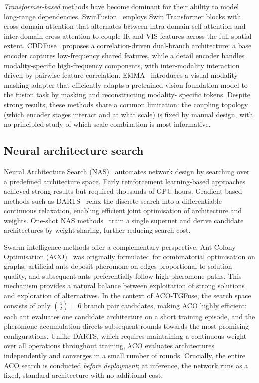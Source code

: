 \documentclass[a4paper,fleqn]{cas-dc}
\begin{document}
\emph{Transformer-based} methods have become dominant for their ability to
model long-range dependencies.  SwinFusion~\cite{swinfusion2022} employs
Swin Transformer blocks with cross-domain attention that alternates between
intra-domain self-attention and inter-domain cross-attention to couple
IR and VIS features across the full spatial extent.  CDDFuse~\cite{cddfuse2023}
proposes a correlation-driven dual-branch architecture: a base encoder captures
low-frequency shared features, while a detail encoder handles
modality-specific high-frequency components, with inter-modality interaction
driven by pairwise feature correlation.  EMMA~\cite{emma2024} introduces a
visual modality masking adapter that efficiently adapts a pretrained vision
foundation model to the fusion task by masking and reconstructing modality-
specific tokens.  Despite strong results, these methods share a common
limitation: the coupling topology (which encoder stages interact and at what
scale) is fixed by manual design, with no principled study of which scale
combination is most informative.

\subsection{Neural architecture search}
\label{sec:rw:nas}

Neural Architecture Search (NAS)~\cite{nas2019} automates network design by
searching over a predefined architecture space.  Early reinforcement
learning-based approaches~\cite{nas2019} achieved strong results but required
thousands of GPU-hours.  Gradient-based methods such as
DARTS~\cite{oneshotnas2020} relax the discrete search into a differentiable
continuous relaxation, enabling efficient joint optimisation of architecture
and weights.  One-shot NAS methods~\cite{oneshotnas2020} train a single
supernet and derive candidate architectures by weight sharing, further
reducing search cost.

Swarm-intelligence methods offer a complementary perspective.  Ant Colony
Optimisation (ACO)~\cite{aco1992} was originally formulated for combinatorial
optimisation on graphs: artificial ants deposit pheromone on edges
proportional to solution quality, and subsequent ants preferentially follow
high-pheromone paths.  This mechanism provides a natural balance between
exploitation of strong solutions and exploration of alternatives.  In the
context of ACO-TGFuse, the search space consists of only $\binom{4}{2}=6$
branch pair candidates, making ACO highly efficient: each ant evaluates one
candidate architecture on a short training episode, and the pheromone
accumulation directs subsequent rounds towards the most promising
configurations.  Unlike DARTS, which requires maintaining a continuous weight
over all operations throughout training, ACO evaluates architectures
independently and converges in a small number of rounds.  Crucially, the
entire ACO search is conducted \emph{before deployment}; at inference, the
network runs as a fixed, standard architecture with no additional cost.
\end{document}
